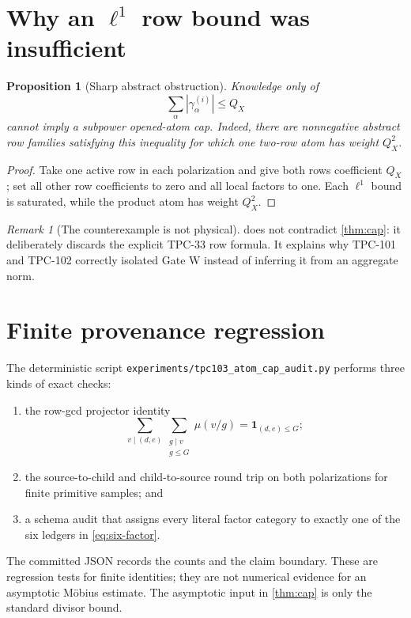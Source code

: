 \documentclass[11pt]{article}
\newtheorem{proposition}[theorem]{Proposition}
\theoremstyle{definition}
\theoremstyle{remark}
\newtheorem{remark}[theorem]{Remark}
\newcommand{\one}{\mathbf 1}
\begin{document}
\section{Why an \texorpdfstring{\(\ell^1\)}{l1} row bound was insufficient}
\label{sec:obstruction}

\begin{proposition}[Sharp abstract obstruction]
\label{prop:l1-obstruction}
Knowledge only of
\[
 \sum_\alpha|\gamma_\alpha^{(i)}|\le Q_X
\]
cannot imply a subpower opened-atom cap.  Indeed, there are
nonnegative abstract row families satisfying this inequality for
which one two-row atom has weight \(Q_X^2\).
\end{proposition}

\begin{proof}
Take one active row in each polarization and give both rows
coefficient \(Q_X\); set all other row coefficients to zero and
all local factors to one.  Each \(\ell^1\) bound is saturated, while
the product atom has weight \(Q_X^2\).
\end{proof}

\begin{remark}[The counterexample is not physical]
 does not contradict
\cref{thm:cap}: it deliberately discards the explicit TPC-33 row
formula.  It explains why TPC-101 and TPC-102 correctly isolated
Gate W instead of inferring it from an aggregate norm.
\end{remark}

\section{Finite provenance regression}
\label{sec:certificate}

The deterministic script
\texttt{experiments/tpc103\_atom\_cap\_audit.py} performs three
kinds of exact checks:
\begin{enumerate}[leftmargin=2em]
\item the row-gcd projector identity
\[
 \sum_{v\mid(d,e)}
 \sum_{\substack{g\mid v\\g\le G}}\mu(v/g)
 =
 \one_{(d,e)\le G};
\]
\item the source-to-child and child-to-source round trip on both
polarizations for finite primitive samples; and
\item a schema audit that assigns every literal factor category
to exactly one of the six ledgers in \eqref{eq:six-factor}.
\end{enumerate}
The committed JSON records the counts and the claim boundary.
These are regression tests for finite identities; they are not
numerical evidence for an asymptotic M\"obius estimate.  The
asymptotic input in \cref{thm:cap} is only the standard divisor
bound.
\end{document}
